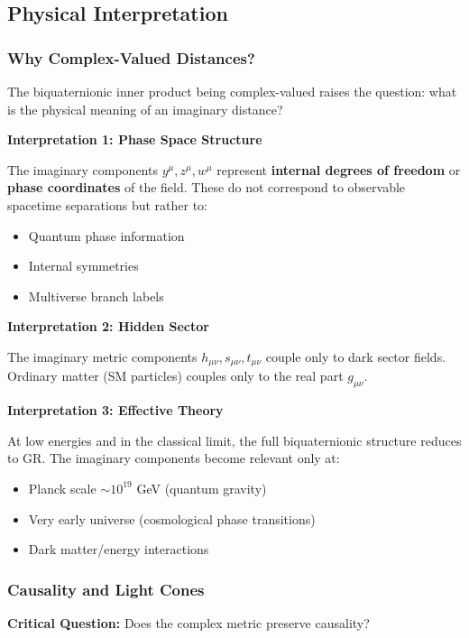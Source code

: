 \subsection{Physical Interpretation}

\subsubsection{Why Complex-Valued Distances?}

The biquaternionic inner product being complex-valued raises the question: what is the physical meaning of an imaginary distance?

\textbf{Interpretation 1: Phase Space Structure}

The imaginary components $y^{\mu}, z^{\mu}, w^{\mu}$ represent \textbf{internal degrees of freedom} or \textbf{phase coordinates} of the field. These do not correspond to observable spacetime separations but rather to:
\begin{itemize}
\item Quantum phase information
\item Internal symmetries
\item Multiverse branch labels
\end{itemize}

\textbf{Interpretation 2: Hidden Sector}

The imaginary metric components $h_{\mu\nu}, s_{\mu\nu}, t_{\mu\nu}$ couple only to dark sector fields. Ordinary matter (SM particles) couples only to the real part $g_{\mu\nu}$.

\textbf{Interpretation 3: Effective Theory}

At low energies and in the classical limit, the full biquaternionic structure reduces to GR. The imaginary components become relevant only at:
\begin{itemize}
\item Planck scale $\sim 10^{19}$ GeV (quantum gravity)
\item Very early universe (cosmological phase transitions)
\item Dark matter/energy interactions
\end{itemize}

\subsubsection{Causality and Light Cones}

\textbf{Critical Question:} Does the complex metric preserve causality?

